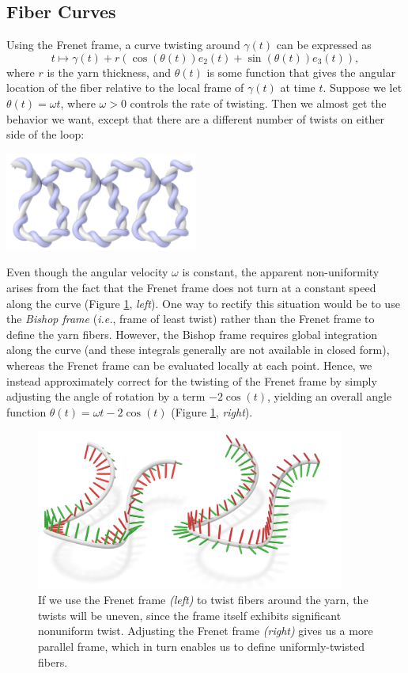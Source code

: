\documentclass{article}
\newcommand{\ie}{\emph{i.e.}}
\begin{document}
\subsection{Fiber Curves}
\label{sec:FiberCurves}

Using the Frenet frame, a curve twisting around \(\gamma(t)\) can be expressed as
\[
   t \mapsto \gamma(t) + r( \cos(\theta(t)) e_2(t) + \sin(\theta(t)) e_3(t) ),
\]
where \(r\) is the yarn thickness, and \(\theta(t)\) is some function that gives the angular location of the fiber relative to the local frame of \(\gamma(t)\) at time \(t\).  Suppose we let \(\theta(t) = \omega t\), where \(\omega > 0\) controls the rate of twisting.  Then we almost get the behavior we want, except that there are a different number of twists on either side of the loop:

\begin{center}
   \includegraphics[width=2.5in]{images/fiber-uneven.jpg}
\end{center}

Even though the angular velocity \(\omega\) is constant, the apparent non-uniformity arises from the fact that the Frenet frame does not turn at a constant speed along the curve (Figure \ref{fig:frenet-frame}, \emph{left}).  One way to rectify this situation would be to use the \emph{Bishop frame} (\ie, frame of least twist) rather than the Frenet frame to define the yarn fibers.  However, the Bishop frame requires global integration along the curve (and these integrals generally are not available in closed form), whereas the Frenet frame can be evaluated locally at each point.  Hence, we instead approximately correct for the twisting of the Frenet frame by simply adjusting the angle of rotation by a term \(-2\cos(t)\), yielding an overall angle function \(\theta(t) = \omega t - 2\cos(t)\) (Figure \ref{fig:frenet-frame}, \emph{right}).

\begin{figure}[h!]
   \centering
   \includegraphics[width=4in]{images/frenet-frame.jpg}
   \caption{If we use the Frenet frame \emph{(left)} to twist fibers around the yarn, the twists will be uneven, since the frame itself exhibits significant nonuniform twist.  Adjusting the Frenet frame \emph{(right)} gives us a more parallel frame, which in turn enables us to define uniformly-twisted fibers.}
   \label{fig:frenet-frame}
\end{figure}
\end{document}
